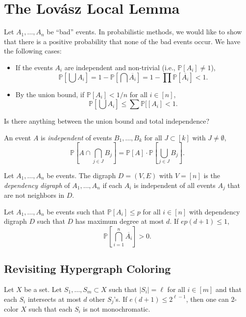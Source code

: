 \documentclass[letterpaper, reqno,11pt]{article}
\newcommand{\PP}{\mathbb{P}}
\begin{document}
\section{The Lov\'{a}sz Local Lemma}

Let $A_1, \ldots, A_n$ be ``bad'' events. In probabilistic methods, we would like to show that there is a positive probability that none of the bad events occur. We have the following cases:
\begin{itemize}[itemsep=0pt]
  \item If the events $A_i$ are independent and non-trivial (i.e., $\PP[A_i] \neq 1$),
  $$ \PP\left[\bigcup A_i\right] = 1 - \PP\left[\bigcap \overline{A_i}\right] = 1 - \prod \PP\left[\overline{A_i}\right] < 1. $$
  \item By the union bound, if $\PP[A_i] < 1/n$ for all $i \in [n]$,
  $$ \PP\left[\bigcup A_i\right] \leq \sum \PP[\left[A_i\right] < 1. $$
\end{itemize}
Is there anything between the union bound and total independence?

\begin{definition}
  An event $A$ is \emph{independent} of events $B_1, \ldots, B_k$ for all $J \subset [k]$ with $J \neq \emptyset$,
  $$ \PP\left[A \cap \bigcap_{j \in J} B_j\right] = \PP[A] \cdot \PP\left[\bigcup_{j \in J} B_j\right]. $$
\end{definition}

\begin{definition}
  Let $A_1, \ldots, A_n$ be events. The digraph $D = (V, E)$ with $V = [n]$ is the \emph{dependency digraph} of $A_1, \ldots, A_n$ if each $A_i$ is independent of all events $A_j$ that are not neighbors in $D$.
\end{definition}

\begin{theorem}
  Let $A_1, \ldots, A_n$ be events such that $\PP[A_i] \leq p$ for all $i \in [n]$ with dependency digraph $D$ such that $D$ has maximum degree at most $d$. If $ep(d + 1) \leq 1$,
  $$ \PP\left[\bigcap_{i = 1}^n \overline{A_i}\right] > 0. $$
\end{theorem}

\subsection{Revisiting Hypergraph Coloring}

\begin{theorem}
  Let $X$ be a set. Let $S_1, \ldots, S_m \subset X$ such that $|S_i| = \ell$ for all $i \in [m]$ and that each $S_i$ intersects at most $d$ other $S_j$'s. If $e(d + 1) \leq 2^{\ell - 1}$, then one can $2$-color $X$ such that each $S_i$ is not monochromatic.
\end{theorem}
\end{document}
